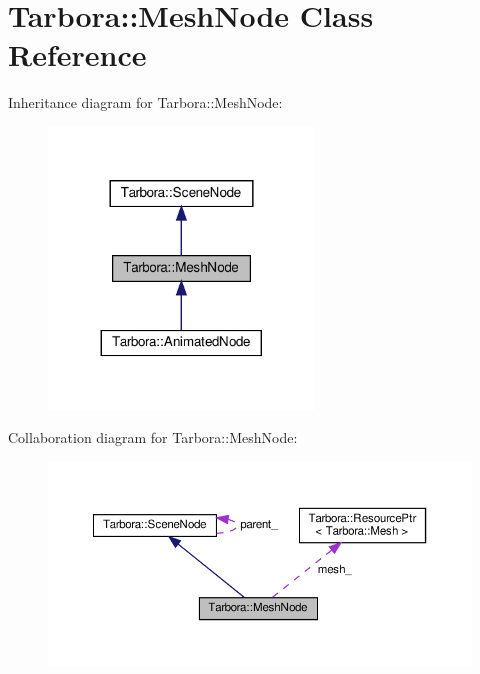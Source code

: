 \hypertarget{classTarbora_1_1MeshNode}{}\section{Tarbora\+:\+:Mesh\+Node Class Reference}
\label{classTarbora_1_1MeshNode}


Inheritance diagram for Tarbora\+:\+:Mesh\+Node\+:
\nopagebreak
\begin{figure}[H]
\begin{center}
\leavevmode
\includegraphics[width=200pt]{classTarbora_1_1MeshNode__inherit__graph}
\end{center}
\end{figure}


Collaboration diagram for Tarbora\+:\+:Mesh\+Node\+:
\nopagebreak
\begin{figure}[H]
\begin{center}
\leavevmode
\includegraphics[width=350pt]{classTarbora_1_1MeshNode__coll__graph}
\end{center}
\end{figure}
